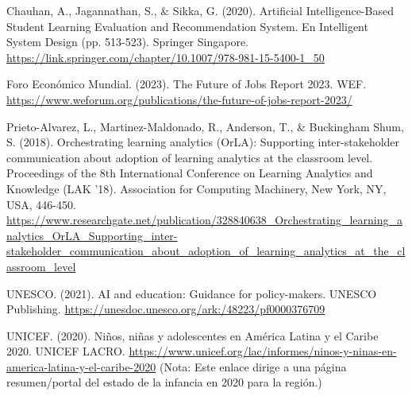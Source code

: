 
Chauhan, A., Jagannathan, S., \& Sikka, G. (2020). Artificial Intelligence-Based Student Learning Evaluation and Recommendation System. En Intelligent System Design (pp. 513-523). Springer Singapore. \url{https://link.springer.com/chapter/10.1007/978-981-15-5400-1_50}
\newline

Foro Económico Mundial. (2023). The Future of Jobs Report 2023. WEF. \url{https://www.weforum.org/publications/the-future-of-jobs-report-2023/}
\newline

Prieto-Alvarez, L., Martinez-Maldonado, R., Anderson, T., \& Buckingham Shum, S. (2018). Orchestrating learning analytics (OrLA): Supporting inter-stakeholder communication about adoption of learning analytics at the classroom level. Proceedings of the 8th International Conference on Learning Analytics and Knowledge (LAK '18). Association for Computing Machinery, New York, NY, USA, 446-450. \url{https://www.researchgate.net/publication/328840638_Orchestrating_learning_analytics_OrLA_Supporting_inter-stakeholder_communication_about_adoption_of_learning_analytics_at_the_classroom_level}
\newline

UNESCO. (2021). AI and education: Guidance for policy-makers. UNESCO Publishing. \url{https://unesdoc.unesco.org/ark:/48223/pf0000376709}
\newline

UNICEF. (2020). Niños, niñas y adolescentes en América Latina y el Caribe 2020. UNICEF LACRO. \url{https://www.unicef.org/lac/informes/ninos-y-ninas-en-america-latina-y-el-caribe-2020} (Nota: Este enlace dirige a una página resumen/portal del estado de la infancia en 2020 para la región.)
